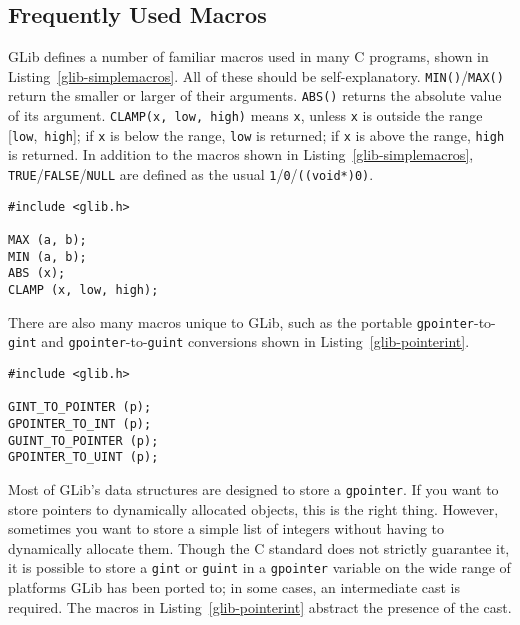 \subsection{Frequently Used Macros}

GLib defines a number of familiar macros used in many C programs, shown in Listing~\ref{glib-simplemacros}. All of these should be self-explanatory. \lstinline{MIN()}/\lstinline{MAX()} return the smaller or larger of their arguments. \lstinline{ABS()} returns the absolute value of its argument. \lstinline{CLAMP(x, low, high)} means \lstinline{x}, unless \lstinline{x} is outside the range [\lstinline{low},~\lstinline{high}]; if \lstinline{x} is below the range, \lstinline{low} is returned; if \lstinline{x} is above the range, \lstinline{high} is returned. In addition to the macros shown in Listing~\ref{glib-simplemacros}, \lstinline{TRUE}/\lstinline{FALSE}/\lstinline{NULL} are defined as the usual \lstinline{1}/\lstinline{0}/\lstinline{((void*)0)}.

\begin{lstlisting}[float, caption={Familiar C Macros}, label=glib-simplemacros]
#include <glib.h>

MAX (a, b);
MIN (a, b);
ABS (x);
CLAMP (x, low, high);
\end{lstlisting}

There are also many macros unique to GLib, such as the portable \lstinline{gpointer}-to-\lstinline{gint} and \lstinline{gpointer}-to-\lstinline{guint} conversions shown in Listing~\ref{glib-pointerint}.

\begin{lstlisting}[float, caption={Macros for storing integers in pointers}, label=glib-pointerint]
#include <glib.h>

GINT_TO_POINTER (p);
GPOINTER_TO_INT (p);
GUINT_TO_POINTER (p);
GPOINTER_TO_UINT (p);
\end{lstlisting}

Most of GLib's data structures are designed to store a \lstinline{gpointer}. If you want to store pointers to dynamically allocated objects, this is the right thing. However, sometimes you want to store a simple list of integers without having to dynamically allocate them. Though the C standard does not strictly guarantee it, it is possible to store a \lstinline{gint} or \lstinline{guint} in a \lstinline{gpointer} variable on the wide range of platforms GLib has been ported to; in some cases, an intermediate cast is required. The macros in Listing~\ref{glib-pointerint} abstract the presence of the cast.

